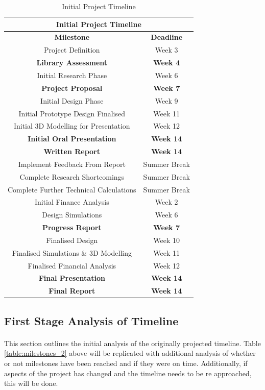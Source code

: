 \begin{table}[H]
\centering
\begin{tabular}{||c c||} 
 \hline
 \multicolumn{2}{|c|}{\textbf{Initial Project Timeline}} \\ [0.5ex] 
 \hline\hline
 \textbf{Milestone} & \textbf{Deadline} \\ 
 \hline\hline
 Project Definition & Week 3 \\ 
 \textbf{Library Assessment} & \textbf{Week 4} \\
 Initial Research Phase & Week 6 \\
 \textbf{Project Proposal} & \textbf{Week 7} \\
 Initial Design Phase & Week 9 \\
 Initial Prototype Design Finalised & Week 11 \\
 Initial 3D Modelling for Presentation & Week 12 \\
  \textbf{Initial Oral Presentation} & \textbf{Week 14} \\ 
 \textbf{Written Report} & \textbf{Week 14} \\ 
 Implement Feedback From Report & Summer Break \\
 Complete Research Shortcomings & Summer Break \\
 Complete Further Technical Calculations & Summer Break \\
 Initial Finance Analysis & Week 2 \\
 Design Simulations & Week 6 \\
 \textbf{Progress Report} & \textbf{Week 7} \\
 Finalised Design & Week 10 \\
 Finalised Simulations \& 3D Modelling & Week 11 \\
 Finalised Financial Analysis & Week 12 \\
 \textbf{Final Presentation} & \textbf{Week 14} \\
 \textbf{Final Report} & \textbf{Week 14} \\ [1ex] 
 \hline
\end{tabular}
\caption{Initial Project Timeline}
\label{table:milestones_1}
\end{table}    

\subsection{First Stage Analysis of Timeline}

\paragraph{}
This section outlines the initial analysis of the originally projected timeline. Table \ref{table:milestones_2} above will be replicated with additional analysis of whether or not milestones have been reached and if they were on time. Additionally, if aspects of the project has changed and the timeline needs to be re approached, this will be done.  

